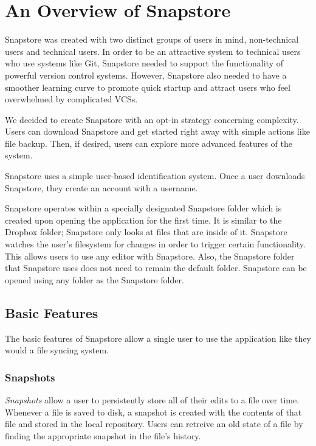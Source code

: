 \chapter{An Overview of Snapstore}

Snapstore was created with two distinct groups of users in mind, non-technical users and technical users. In order to be an attractive system to technical users who use systems like Git, Snapstore needed to support the functionality of powerful version control systems. However, Snapstore also needed to have a smoother learning curve to promote quick startup and attract users who feel overwhelmed by complicated VCSs. 

We decided to create Snapstore with an opt-in strategy concerning complexity. Users can download Snapstore and get started right away with simple actions like file backup. Then, if desired, users can explore more advanced features of the system.

Snapstore uses a simple user-based identification system. Once a user downloads Snapstore, they create an account with a username.

Snapstore operates within a specially designated Snapstore folder which is created upon opening the application for the first time. It is similar to the Dropbox folder; Snapstore only looks at files that are inside of it. Snapstore watches the user's filesystem for changes in order to trigger certain functionality. This allows users to use any editor with Snapstore. Also, the Snapstore folder that Snapstore uses does not need to remain the default folder. Snapstore can be opened using any folder as the Snapstore folder.

\section{Basic Features}

The basic features of Snapstore allow a single user to use the application like they would a file syncing system.

\subsection{Snapshots}

\textit{Snapshots} allow a user to persistently store all of their edits to a file over time. Whenever a file is saved to disk, a snapshot is created with the contents of that file and stored in the local repository. Users can retreive an old state of a file by finding the appropriate snapshot in the file's history.

